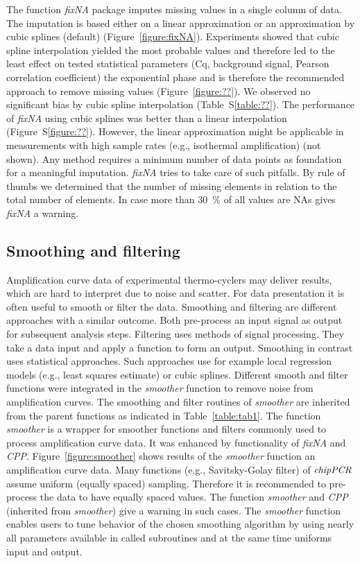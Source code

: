 \documentclass[twocolumn]{bmcart}%
\begin{document}
  The function \textsl{fixNA} package imputes missing values in a single column 
of data. The imputation is based either on a linear approximation or an 
approximation by cubic splines (default) (Figure~\ref{figure:fixNA}). 
Experiments showed that cubic spline interpolation yielded the most probable 
values and therefore led to the least effect on tested statistical parameters 
(Cq, background signal, Pearson correlation coefficient) the exponential phase 
and is therefore the recommended approach to remove missing values 
(Figure~\ref{figure:??}). We observed no significant bias by cubic spline 
interpolation (Table~S\ref{table:??}). The performance of \textsl{fixNA} using 
cubic splines was better than a linear interpolation (Figure~S\ref{figure:??}). 
However, the linear 
approximation might be applicable in measurements with high sample rates (e.g., 
isothermal amplification) (not shown). Any method requires a minimum number of 
data points as foundation for a meaningful imputation. \textsl{fixNA} tries to 
take care of such pitfalls. By rule of thumbs we determined that the number of 
missing elements in relation to the total number of elements. In case more than 
30~\% of all values are NAs gives \textsl{fixNA} a warning.

\subsection*{Smoothing and filtering}

  Amplification curve data of experimental thermo-cyclers may deliver results, 
which are hard to interpret due to noise and scatter. For data presentation it 
is often useful to smooth or filter the data. Smoothing and filtering are 
different approaches with a similar outcome. Both pre-process an input signal as 
output for subsequent analysis steps. Filtering uses 
methods of signal processing. They take a data input and apply a function to 
form an output. Smoothing in contrast uses statistical approaches. Such 
approaches use for example local regression models (e.g., least squares 
estimate) or cubic splines. Different smooth and filter functions were 
integrated in the \textsl{smoother} function to remove noise from amplification 
curves. The smoothing and filter routines of \textsl{smoother} 
are inherited from the parent functions as indicated in 
Table~\ref{table:tab1}. The function \textsl{smoother} is a 
wrapper for smoother functions and filters commonly used to process 
amplification curve data. It was enhanced by functionality of \textsl{fixNA} and 
\textsl{CPP}. Figure~\ref{figure:smoother} shows results of the 
\textsl{smoother} function an amplification curve data. Many functions (e.g., 
Savitsky-Golay filter) of $\emph{chipPCR}$ assume uniform (equally spaced) 
sampling. Therefore it is recommended to pre-process the data to have equally 
spaced values. The function \textsl{smoother} and \textsl{CPP} (inherited from 
\textsl{smoother}) give a warning in such cases. The \textsl{smoother} function 
enables users to tune behavior of the chosen smoothing algorithm by using nearly 
all parameters available in called subroutines and at the same time uniforms 
input and output.
\end{document}
